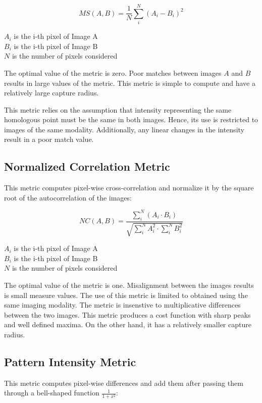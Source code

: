 \begin{equation}
MS(A,B) = \frac{1}{N} \sum_i^N \left( A_i - B_i \right)^2
\end{equation}
\begin{center}
$A_i$ is the i-th pixel of Image A\\ 
$B_i$ is the i-th pixel of Image B\\
$N$ is the number of pixels considered
\end{center}

The optimal value of the metric is zero. Poor matches between images
$A$ and $B$ results in large values of the metric. This metric is
simple to compute and have a relatively large capture radius.

This metric relies on the assumption that intensity representing
the same homologous point must be the same in both images. Hence,
its use is restricted to images of the same modality. Additionally,
any linear changes in the intensity result in a poor match value.

\subsection{Normalized Correlation Metric}
This metric computes pixel-wise cross-correlation and normalize it
by the square root of the autocorrelation of the images:

\begin{equation}
NC(A,B) = \frac{ \sum_i^N \left( A_i \cdot B_i \right) }
         { \sqrt { \sum_i^N A_i^2  \cdot \sum_i^N B_i^2 } }
\end{equation}
\begin{center}
$A_i$ is the i-th pixel of Image A\\ 
$B_i$ is the i-th pixel of Image B\\
$N$ is the number of pixels considered
\end{center}

The optimal value of the metric is one. Misalignment between the
images results is small measure values. The use of this metric
is limited to obtained using the same imaging modality. The metric
is insenstive to multiplicative differences between the two
images. This metric produces a cost function with sharp peaks and well
defined maxima. On the other hand, it has a relatively smaller
capture radius.

\subsection{Pattern Intensity Metric}
This metric computes pixel-wise differences and add them 
after passing them through a bell-shaped function $\frac{1}{1+x^2}$:

